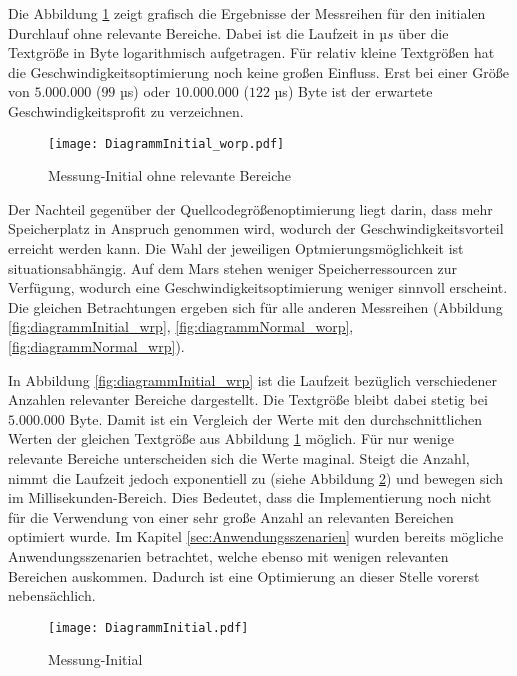 Die Abbildung \ref{fig:diagrammInitial_worp} zeigt grafisch die Ergebnisse der
Messreihen für den initialen Durchlauf ohne relevante Bereiche. Dabei ist die
Laufzeit in $µs$ über die Textgröße in Byte logarithmisch aufgetragen. Für
relativ kleine Textgrößen hat die Geschwindigkeitsoptimierung noch keine großen
Einfluss. Erst bei einer Größe von $5.000.000$ ($99$ µs) oder
$10.000.000$ ($122$ µs) Byte ist der erwartete Geschwindigkeitsprofit zu
verzeichnen.

\begin{figure}[H]
	\centering
	\texttt{[image: DiagrammInitial\_worp.pdf]}
	\label{fig:diagrammInitial_worp}
	\caption{Messung-Initial ohne relevante Bereiche}
\end{figure}

Der Nachteil gegenüber der Quellcodegrößenoptimierung liegt darin, dass
mehr Speicherplatz in Anspruch genommen wird, wodurch der
Geschwindigkeitsvorteil erreicht werden kann.
Die Wahl der jeweiligen Optmierungsmöglichkeit ist situationsabhängig. Auf dem
Mars stehen weniger Speicherressourcen zur Verfügung, wodurch eine
Geschwindigkeitsoptimierung weniger sinnvoll erscheint. Die gleichen
Betrachtungen ergeben sich für alle anderen Messreihen (Abbildung
\ref{fig:diagrammInitial_wrp}, \ref{fig:diagrammNormal_worp}, \ref{fig:diagrammNormal_wrp}). 

In Abbildung \ref{fig:diagrammInitial_wrp} ist die Laufzeit bezüglich
verschiedener Anzahlen relevanter Bereiche dargestellt. Die Textgröße bleibt
dabei stetig bei $5.000.000$ Byte. Damit ist ein Vergleich der Werte mit den
durchschnittlichen Werten der gleichen Textgröße aus Abbildung
\ref{fig:diagrammInitial_worp} möglich. Für nur wenige relevante Bereiche
unterscheiden sich die Werte maginal. Steigt die Anzahl, nimmt die Laufzeit
jedoch exponentiell zu (siehe Abbildung \ref{fig:diagrammInitial}) und bewegen
sich im Millisekunden-Bereich. Dies Bedeutet, dass die Implementierung noch
nicht für die Verwendung von einer sehr große Anzahl an relevanten Bereichen
optimiert wurde. Im Kapitel \ref{sec:Anwendungsszenarien} wurden bereits
mögliche Anwendungsszenarien betrachtet, welche ebenso mit wenigen relevanten
Bereichen auskommen. Dadurch ist eine Optimierung an dieser Stelle vorerst
nebensächlich.

\begin{figure}[H]
	\centering
	\texttt{[image: DiagrammInitial.pdf]}
	\label{fig:diagrammInitial}
	\caption{Messung-Initial}
\end{figure}

